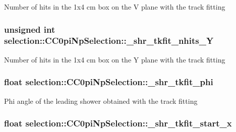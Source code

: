 Number of hits in the 1x4 cm box on the V plane with the track fitting \hypertarget{classselection_1_1CC0piNpSelection_ae3a53326b19594013c9df08b66ccaa73}{
\subsubsection[{\-\_\-shr\-\_\-tkfit\-\_\-nhits\-\_\-\-Y}]{\setlength{\rightskip}{0pt plus 5cm}unsigned int selection\-::\-C\-C0pi\-Np\-Selection\-::\-\_\-shr\-\_\-tkfit\-\_\-nhits\-\_\-\-Y\hspace{0.3cm}{\ttfamily [private]}}}\label{classselection_1_1CC0piNpSelection_ae3a53326b19594013c9df08b66ccaa73}
Number of hits in the 1x4 cm box on the Y plane with the track fitting \hypertarget{classselection_1_1CC0piNpSelection_aefb0bc61c417330a448ababb5363ad8f}{
\subsubsection[{\-\_\-shr\-\_\-tkfit\-\_\-phi}]{\setlength{\rightskip}{0pt plus 5cm}float selection\-::\-C\-C0pi\-Np\-Selection\-::\-\_\-shr\-\_\-tkfit\-\_\-phi\hspace{0.3cm}{\ttfamily [private]}}}\label{classselection_1_1CC0piNpSelection_aefb0bc61c417330a448ababb5363ad8f}
Phi angle of the leading shower obtained with the track fitting \hypertarget{classselection_1_1CC0piNpSelection_a44002e3cc4d16dce6e6f61ee3a2bae6a}{
\subsubsection[{\-\_\-shr\-\_\-tkfit\-\_\-start\-\_\-x}]{\setlength{\rightskip}{0pt plus 5cm}float selection\-::\-C\-C0pi\-Np\-Selection\-::\-\_\-shr\-\_\-tkfit\-\_\-start\-\_\-x\hspace{0.3cm}{\ttfamily [private]}}}\label{classselection_1_1CC0piNpSelection_a44002e3cc4d16dce6e6f61ee3a2bae6a}
